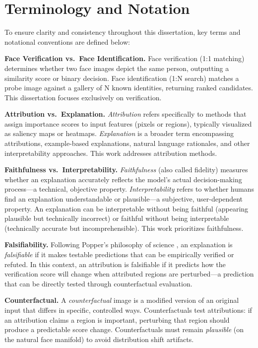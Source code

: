 \section{Terminology and Notation}
\label{sec:terminology}

To ensure clarity and consistency throughout this dissertation, key terms and notational conventions are defined below:

\textbf{Face Verification vs.\ Face Identification.} Face verification (1:1 matching) determines whether two face images depict the same person, outputting a similarity score or binary decision. Face identification (1:N search) matches a probe image against a gallery of N known identities, returning ranked candidates. This dissertation focuses exclusively on verification.

\textbf{Attribution vs.\ Explanation.} \emph{Attribution} refers specifically to methods that assign importance scores to input features (pixels or regions), typically visualized as saliency maps or heatmaps. \emph{Explanation} is a broader term encompassing attributions, example-based explanations, natural language rationales, and other interpretability approaches. This work addresses attribution methods.

\textbf{Faithfulness vs.\ Interpretability.} \emph{Faithfulness} (also called fidelity) measures whether an explanation accurately reflects the model's actual decision-making process---a technical, objective property. \emph{Interpretability} refers to whether humans find an explanation understandable or plausible---a subjective, user-dependent property. An explanation can be interpretable without being faithful (appearing plausible but technically incorrect) or faithful without being interpretable (technically accurate but incomprehensible). This work prioritizes faithfulness.

\textbf{Falsifiability.} Following Popper's philosophy of science \cite{popper1959logic}, an explanation is \emph{falsifiable} if it makes testable predictions that can be empirically verified or refuted. In this context, an attribution is falsifiable if it predicts how the verification score will change when attributed regions are perturbed---a prediction that can be directly tested through counterfactual evaluation.

\textbf{Counterfactual.} A \emph{counterfactual} image is a modified version of an original input that differs in specific, controlled ways. Counterfactuals test attributions: if an attribution claims a region is important, perturbing that region should produce a predictable score change. Counterfactuals must remain \emph{plausible} (on the natural face manifold) to avoid distribution shift artifacts.

